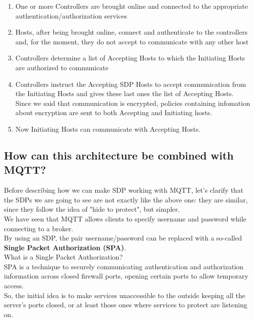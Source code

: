 \documentclass[12pt]{report}
\begin{document}
{\begin{enumerate}
\item One or more Controllers are brought online and connected to the appropriate authentication/authorization services
\item Hosts, after being brought online, connect and authenticate to the controllers and, for the moment, they do not accept to communicate with any other host
\item Controllers determine a list of Accepting Hosts to which the Initiating Hosts are authorized to communicate
\item Controllers instruct the Accepting SDP Hosts to accept communication from the Initiating Hosts and gives these last ones the list of Accepting Hosts.\\
Since we said that communication is encrypted, policies containing infomation about encryption are sent to both Accepting and Initiating hosts.
\item Now Initiating Hosts can communicate with Accepting Hosts.\\
\end{enumerate}

\subsection{How can this architecture be combined with MQTT?}
\bigskip
Before describing how we can make SDP working with MQTT, let's clarify that the SDPs we are going to see are not exactly like the above one: they are similar, since they follow the idea of "hide to protect", but simpler.\\

We have seen that MQTT allows clients to specify username and password while connecting to a broker.\\By using an SDP, the pair username/password can be replaced with a so-called \textbf{Single Packet Authorization (SPA)}.\\

What is a Single Packet Authorization?\\

SPA is a technique to securely communicating authentication and authorization information across closed firewall ports, opening certain ports to allow temporary access.\\
So, the initial idea is to make services unaccessible to the outside keeping all the server's ports closed, or at least those ones where services to protect are listening on.\\

}
\end{document}

